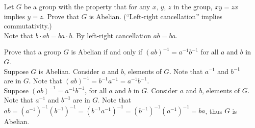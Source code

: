 \documentclass[12pt]{article}
\makeatletter
\theoremstyle{homework}
\newenvironment{exercise}[1]
{\def\@currentlabel{#1}\exercisecore}
{\endexercisecore}
\makeatother
\begin{document}
\begin{exercise}
{2.22}
Let $G$ be a group with the property that for any $x$, $y$, $z$ in the group, $xy = zx$ implies $y = z$. Prove that $G$ is Abelian. (“Left-right cancellation” implies commutativity.)\\
Note that $b\cdot ab=ba\cdot b$.  By left-right cancellation $ab=ba$.
\end{exercise}

\begin{exercise}
{2.25}
Prove that a group $G$ is Abelian if and only if $(ab)^{-1}=a^{-1}b^{-1}$ for all $a$ and $b$ in $G$.\\
Suppose $G$ is Abelian.  Consider $a$ and $b$, elements of $G$.  Note that $a^{-1}$ and $b^{-1}$ are in $G$.  Note that $(ab)^{-1}=b^{-1}a^{-1}=a^{-1}b^{-1}$.\\
Suppose $(ab)^{-1}=a^{-1}b^{-1}$, for all $a$ and $b$ in $G$.  Consider $a$ and $b$, elements of $G$.  Note that $a^{-1}$ and $b^{-1}$ are in $G$.  Note that $ab=(a^{-1})^{-1}(b^{-1})^{-1}=(b^{-1}a^{-1})^{-1}=(b^{-1})^{-1}(a^{-1})^{-1}=ba$, thus $G$ is Abelian.
\end{exercise}
\end{document}
